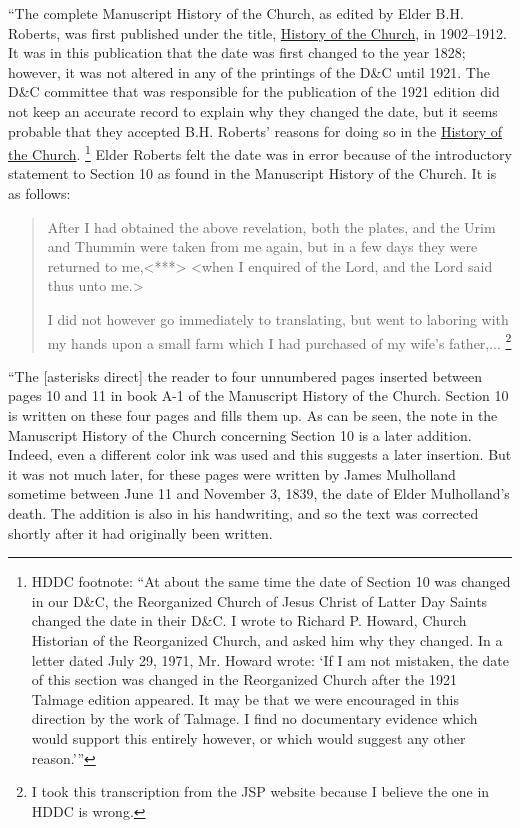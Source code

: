 			``The complete Manuscript History of the Church, as edited by Elder B.H. Roberts, was first published under the title, \uline{History of the Church}, in 1902--1912. It was in this publication that the date was first changed to the year 1828; however, it was not altered in any of the printings of the D\&C until 1921. The D\&C committee that was responsible for the publication of the 1921 edition did not keep an accurate record to explain why they changed the date, but it seems probable that they accepted B.H. Roberts' reasons for doing so in the \uline{History of the Church}.%
				\footnote{%
					HDDC footnote: ``At about the same time the date of Section 10 was changed in our D\&C, the Reorganized Church of Jesus Christ of Latter Day Saints changed the date in their D\&C. I wrote to Richard P. Howard, Church Historian of the Reorganized Church, and asked him why they changed. In a letter dated July 29, 1971, Mr. Howard wrote: `If I am not mistaken, the date of this section was changed in the Reorganized Church after the 1921 Talmage edition appeared. It may be that we were encouraged in this direction by the work of Talmage. I find no documentary evidence which would support this entirely however, or which would suggest any other reason.'''
					}
			Elder Roberts felt the date was in error because of the introductory statement to Section 10 as found in the Manuscript History of the Church. It is as follows:
			
				\begin{quote}
					After I had obtained the above revelation, both the plates, and the Urim and Thummin were taken from me again, but in a few days they were returned to me,<***> <when I enquired of the Lord, and the Lord said thus unto me.>
					
					I did not however go immediately to translating, but went to laboring with my hands upon a small farm which I had purchased of my wife's father,...%
						\footnote{%
							I took this transcription from the JSP website because I believe the one in HDDC is wrong.
							}
				\end{quote}
				
			\noindent ``The [asterisks direct] the reader to four unnumbered pages inserted between pages 10 and 11 in book A-1 of the Manuscript History of the Church. Section 10 is written on these four pages and fills them up. As can be seen, the note in the Manuscript History of the Church concerning Section 10 is a later addition. Indeed, even a different color ink was used and this suggests a later insertion. But it was not much later, for these pages were written by James Mulholland sometime between June 11 and November 3, 1839, the date of Elder Mulholland's death. The addition is also in his handwriting, and so the text was corrected shortly after it had originally been written.
			
